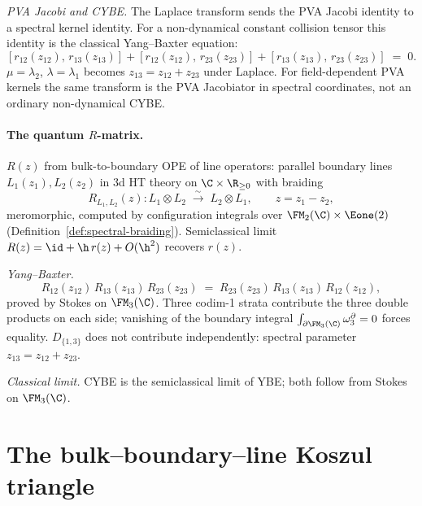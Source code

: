 \emph{PVA Jacobi and CYBE.} The Laplace transform sends the PVA
Jacobi identity to a spectral kernel identity. For a non-dynamical
constant collision tensor this identity is the classical Yang--Baxter
equation:
\begin{equation}
\label{eq:intro-CYBE}
[r_{12}(z_{12}),\, r_{13}(z_{13})] +
[r_{12}(z_{12}),\, r_{23}(z_{23})] +
[r_{13}(z_{13}),\, r_{23}(z_{23})] \;=\; 0.
\end{equation}
$\mu = \lambda_2$, $\lambda = \lambda_1$ becomes
$z_{13} = z_{12} + z_{23}$ under Laplace. For field-dependent PVA
kernels the same transform is the PVA Jacobiator in spectral
coordinates, not an ordinary non-dynamical CYBE.

\paragraph{The quantum $R$-matrix.}
$R(z)$ from bulk-to-boundary OPE of line operators: parallel
boundary lines $L_1(z_1), L_2(z_2)$ in 3d HT theory on
$\C \times \R_{\ge 0}$ with braiding
\[
R_{L_1, L_2}(z) \colon L_1 \otimes L_2
\;\xrightarrow{\;\sim\;}\; L_2 \otimes L_1,
\qquad z = z_1 - z_2,
\]
meromorphic, computed by configuration integrals over
$\FM_2(\C) \times \Eone(2)$
(Definition~\ref{def:spectral-braiding}). Semiclassical limit
$R(z) = \id + \h\, r(z) + O(\h^2)$ recovers $r(z)$.

\emph{Yang--Baxter.}
\begin{equation}
\label{eq:intro-YBE}
R_{12}(z_{12})\, R_{13}(z_{13})\, R_{23}(z_{23})
\;=\;
R_{23}(z_{23})\, R_{13}(z_{13})\, R_{12}(z_{12}),
\end{equation}
proved by Stokes on $\FM_3(\C)$. Three codim-1 strata contribute
the three double products on each side; vanishing of the
boundary integral
$\int_{\partial \FM_3(\C)} \omega_3^{\partial} = 0$ forces
equality. $D_{\{1,3\}}$ does not contribute independently:
spectral parameter $z_{13} = z_{12} + z_{23}$.

\emph{Classical limit.} CYBE is the semiclassical limit of YBE;
both follow from Stokes on $\FM_3(\C)$.

\section*{The bulk--boundary--line Koszul triangle}

